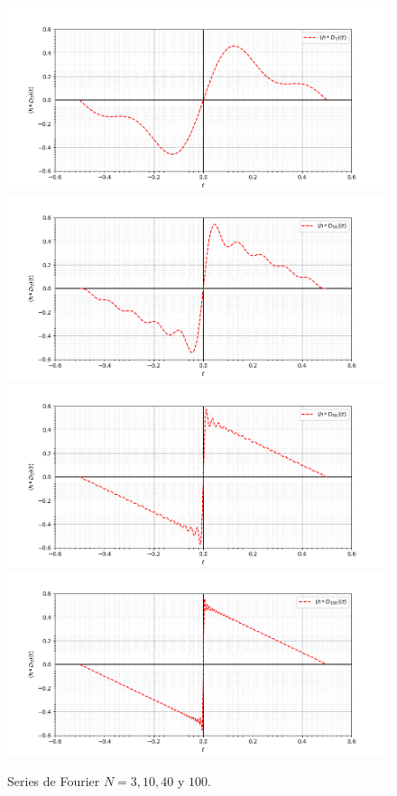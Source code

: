 \begin{figure}[H]
\begin{center}
  \includegraphics[scale=0.31]{Figures/3-serie.png}
  \includegraphics[scale=0.31]{Figures/10-serie.png}\\
  \includegraphics[scale=0.31]{Figures/40-serie.png}
  \includegraphics[scale=0.31]{Figures/100-serie.png}
\end{center}
  \caption{Series de Fourier $N=3,10,40$ y $100$.}
\label{fig:series-de-fourier-h}
\end{figure}
